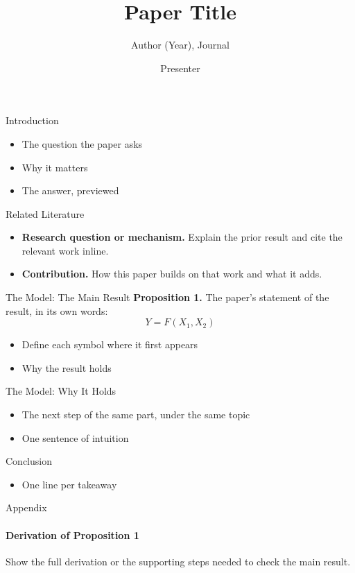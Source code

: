\documentclass[aspectratio=169,11pt]{beamer}
\title{Paper Title}
\subtitle{Author (Year), Journal}
\author{Presenter}
\date{}
\begin{document}
\begin{frame}
  \titlepage
\end{frame}

\begin{frame}{Introduction}
  \begin{itemize}
    \item The question the paper asks
    \item Why it matters
    \item The answer, previewed
  \end{itemize}
\end{frame}

\begin{frame}{Related Literature}
  \begin{itemize}
    \item \textbf{Research question or mechanism.} Explain the prior result and cite the relevant work inline.
    \item \textbf{Contribution.} How this paper builds on that work and what it adds.
  \end{itemize}
\end{frame}

\begin{frame}[label=m-core]{The Model: The Main Result}
  \textbf{Proposition 1.} The paper's statement of the result, in its own words:
  \[
    Y = F(X_1, X_2)
  \]
  \begin{itemize}
    \item Define each symbol where it first appears
    \item Why the result holds
  \end{itemize}
  \vfill\hfill\hyperlink{a-derivation}{}
\end{frame}

\begin{frame}{The Model: Why It Holds}
  \begin{itemize}
    \item The next step of the same part, under the same topic
    \item One sentence of intuition
  \end{itemize}
\end{frame}

\begin{frame}{Conclusion}
  \begin{itemize}
    \item One line per takeaway
  \end{itemize}
\end{frame}

\appendix

\begin{frame}[label=a-derivation]{Appendix}
  \framesubtitle{Derivation of Proposition 1}
  Show the full derivation or the supporting steps needed to check the main result.

  \vfill\hfill\hyperlink{m-core}{}
\end{frame}
\end{document}
